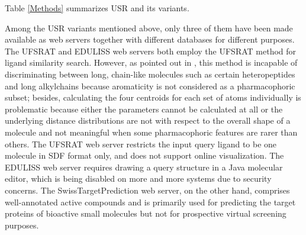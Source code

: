 \documentclass[a4,center,fleqn]{NAR}
\begin{document}
Table \ref{Methods} summarizes USR and its variants.

\begin{table*}
{}%
\end{table*}

Among the USR variants mentioned above, only three of them \cite{1436,1437,1408} have been made available as web servers together with different databases for different purposes. The UFSRAT \cite{1436} and EDULISS \cite{1437} web servers both employ the UFSRAT \cite{1436} method for ligand similarity search. However, as pointed out in \cite{1331}, this method is incapable of discriminating between long, chain-like molecules such as certain heteropeptides and long alkylchains because aromaticity is not considered as a pharmacophoric subset; besides, calculating the four centroids for each set of atoms individually is problematic because either the parameters cannot be calculated at all or the underlying distance distributions are not with respect to the overall shape of a molecule and not meaningful when some pharmacophoric features are rarer than others. The UFSRAT \cite{1436} web server restricts the input query ligand to be one molecule in SDF format only, and does not support online visualization. The EDULISS \cite{1437} web server requires drawing a query structure in a Java molecular editor, which is being disabled on more and more systems due to security concerns. The SwissTargetPrediction \cite{1408} web server, on the other hand, comprises well-annotated active compounds and is primarily used for predicting the target proteins of bioactive small molecules but not for prospective virtual screening purposes.
\end{document}
